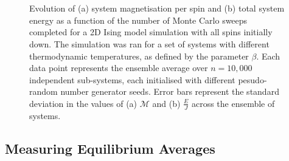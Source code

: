 \documentclass[11pt]{iopart}
\begin{document}
\begin{figure}[t]
  \centering
  \\
    \\
  \caption{Evolution of (a) system magnetisation per spin and (b) total system energy as a function of the number of Monte Carlo sweeps completed for a 2D Ising model simulation with all spins initially down. The simulation was ran for a set of systems with different thermodynamic temperatures, as defined by the parameter $\beta$. Each data point represents the ensemble average over $n = 10,000$ independent sub-systems, each initialised with different pesudo-random number generator seeds. Error bars represent the standard deviation in the values of (a) $\mathcal{M}$ and (b) $\frac{E}{J}$ across the ensemble of systems.}
  \label{fig:convergencegraphs}
\end{figure}

\subsection{Measuring Equilibrium Averages}
\end{document}
